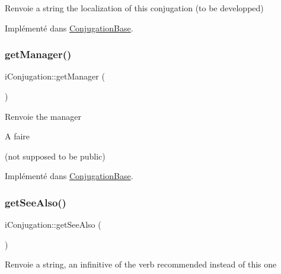 \begin{DoxyReturn}{Renvoie}
a string the localization of this conjugation (to be developped) 
\end{DoxyReturn}


Implémenté dans \hyperlink{class_conjugation_base_a27cc8f5f2a3b502e48c22a5b547181ac}{Conjugation\+Base}.

\hypertarget{interfacei_conjugation_a448829b47813a79d1f8ec65de91e8696}{}\label{interfacei_conjugation_a448829b47813a79d1f8ec65de91e8696} 
\subsubsection{\texorpdfstring{get\+Manager()}{getManager()}}
{\footnotesize\ttfamily i\+Conjugation\+::get\+Manager (\begin{DoxyParamCaption}{ }\end{DoxyParamCaption})}

\begin{DoxyReturn}{Renvoie}
the manager
\end{DoxyReturn}
\begin{DoxyRefDesc}{A faire}
\item[\hyperlink{todo__todo000001}{A faire}](not supposed to be public) \end{DoxyRefDesc}


Implémenté dans \hyperlink{class_conjugation_base_aab285eff4995c059a3aa0abec778a390}{Conjugation\+Base}.

\hypertarget{interfacei_conjugation_a58e61c703ad1f0d76db1535235e530a0}{}\label{interfacei_conjugation_a58e61c703ad1f0d76db1535235e530a0} 
\subsubsection{\texorpdfstring{get\+See\+Also()}{getSeeAlso()}}
{\footnotesize\ttfamily i\+Conjugation\+::get\+See\+Also (\begin{DoxyParamCaption}{ }\end{DoxyParamCaption})}

\begin{DoxyReturn}{Renvoie}
a string, an infinitive of the verb recommended instead of this one 
\end{DoxyReturn}


